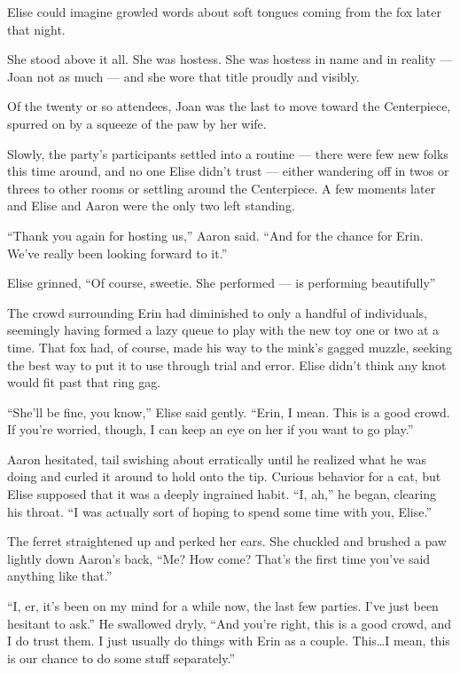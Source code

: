 \documentclass[12pt,letterpaper,oneside]{memoir}
\begin{document}
  Elise could imagine growled words about soft tongues coming from the fox later that night.

  She stood above it all. She was hostess. She was hostess in name and in reality --- Joan not as much --- and she wore that title proudly and visibly.

  Of the twenty or so attendees, Joan was the last to move toward the Centerpiece, spurred on by a squeeze of the paw by her wife.

  Slowly, the party's participants settled into a routine --- there were few new folks this time around, and no one Elise didn't trust --- either wandering off in twos or threes to other rooms or settling around the Centerpiece. A few moments later and Elise and Aaron were the only two left standing.

  ``Thank you again for hosting us,'' Aaron said. ``And for the chance for Erin. We've really been looking forward to it.''

  Elise grinned, ``Of course, sweetie. She performed --- is performing beautifully''

  The crowd surrounding Erin had diminished to only a handful of individuals, seemingly having formed a lazy queue to play with the new toy one or two at a time. That fox had, of course, made his way to the mink's gagged muzzle, seeking the best way to put it to use through trial and error. Elise didn't think any knot would fit past that ring gag.

  ``She'll be fine, you know,'' Elise said gently. ``Erin, I mean. This is a good crowd. If you're worried, though, I can keep an eye on her if you want to go play.''

  Aaron hesitated, tail swishing about erratically until he realized what he was doing and curled it around to hold onto the tip. Curious behavior for a cat, but Elise supposed that it was a deeply ingrained habit. ``I, ah,'' he began, clearing his throat. ``I was actually sort of hoping to spend some time with you, Elise.''

  The ferret straightened up and perked her ears. She chuckled and brushed a paw lightly down Aaron's back, ``Me? How come? That's the first time you've said anything like that.''

  ``I, er, it's been on my mind for a while now, the last few parties. I've just been hesitant to ask.'' He swallowed dryly, ``And you're right, this is a good crowd, and I do trust them. I just usually do things with Erin as a couple. This\ldots{}I mean, this is our chance to do some stuff separately.''
\end{document}
